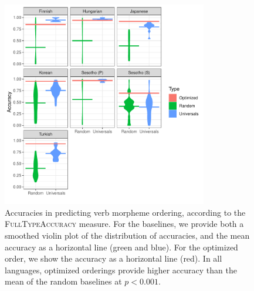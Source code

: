 \documentclass[11pt,letterpaper]{article}
\begin{document}
\begin{figure}[]
    \centering
\includegraphics[width=0.8\textwidth]{figures/accuracies_verbs_full_types.pdf}
    \caption{Accuracies in predicting verb morpheme ordering, according to the \textsc{FullTypeAccuracy} measure.
    For the baselines, we provide both a smoothed violin plot of the distribution of accuracies, and the mean accuracy as a horizontal line (green and blue). For the optimized order, we show the accuracy as a horizontal line (red).
    In all languages, optimized orderings provide higher accuracy than the mean of the random baselines at $p<0.001$.}
    \label{tab:optimized_acc_verbs_full_types}
\end{figure}
%
\end{document}
